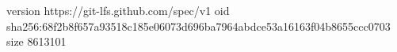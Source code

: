 version https://git-lfs.github.com/spec/v1
oid sha256:68f2b8f657a93518c185e06073d696ba7964abdce53a16163f04b8655ccc0703
size 8613101
